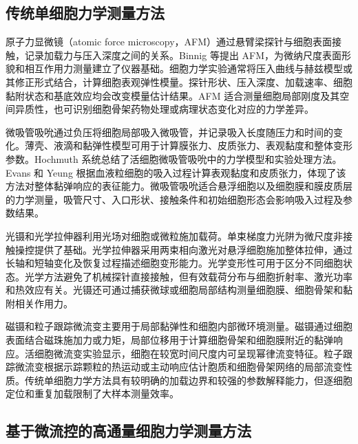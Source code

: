\subsection{传统单细胞力学测量方法}

原子力显微镜（atomic force microscopy，AFM）通过悬臂梁探针与细胞表面接触，记录加载力与压入深度之间的关系。Binnig 等提出 AFM，为微纳尺度表面形貌和相互作用力测量建立了仪器基础\cite{binnig1986afm}。细胞力学实验通常将压入曲线与赫兹模型或其修正形式结合，计算细胞表观弹性模量。探针形状、压入深度、加载速率、细胞黏附状态和基底效应均会改变模量估计结果\cite{gavara2016afm}。AFM 适合测量细胞局部刚度及其空间异质性，也可识别细胞骨架药物处理或病理状态变化对应的力学差异\cite{rotsch2000cytoskeletal,cross2007nanomechanical}。

微吸管吸吮通过负压将细胞局部吸入微吸管，并记录吸入长度随压力和时间的变化。薄壳、液滴和黏弹性模型可用于计算膜张力、皮质张力、表观黏度和整体变形参数。Hochmuth 系统总结了活细胞微吸管吸吮中的力学模型和实验处理方法\cite{hochmuth2000micropipette}。Evans 和 Yeung 根据血液粒细胞的吸入过程计算表观黏度和皮质张力，体现了该方法对整体黏弹响应的表征能力\cite{evans1989granulocytes}。微吸管吸吮适合悬浮细胞以及细胞膜和膜皮质层的力学测量，吸管尺寸、入口形状、接触条件和初始细胞形态会影响吸入过程及参数结果。

光镊和光学拉伸器利用光场对细胞或微粒施加载荷。单束梯度力光阱为微尺度非接触操控提供了基础\cite{ashkin1986singlebeam}。光学拉伸器采用两束相向激光对悬浮细胞施加整体拉伸，通过长轴和短轴变化及恢复过程描述细胞变形能力\cite{guck2001optical}。光学变形性可用于区分不同细胞状态\cite{guck2005opticaldeformability}。光学方法避免了机械探针直接接触，但有效载荷分布与细胞折射率、激光功率和热效应有关。光镊还可通过捕获微球或细胞局部结构测量细胞膜、细胞骨架和黏附相关作用力\cite{svoboda1994optical}。

磁镊和粒子跟踪微流变主要用于局部黏弹性和细胞内部微环境测量。磁镊通过细胞表面结合磁珠施加力或力矩，局部位移用于计算细胞骨架和细胞膜附近的黏弹响应\cite{bausch1999magnetic}。活细胞微流变实验显示，细胞在较宽时间尺度内可呈现幂律流变特征\cite{fabry2001scaling}。粒子跟踪微流变根据示踪颗粒的热运动或主动响应估计胞质和细胞骨架网络的局部流变性质\cite{wirtz2009microrheology}。传统单细胞力学方法具有较明确的加载边界和较强的参数解释能力，但逐细胞定位和重复加载限制了大样本测量效率。

\subsection{基于微流控的高通量细胞力学测量方法}

